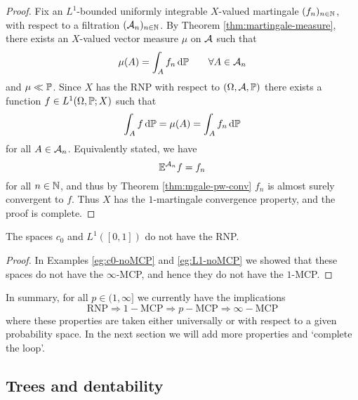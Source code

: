 \begin{proof}
  Fix an $L^1$-bounded uniformly integrable $X$-valued martingale $(f_n)_{n \in \N}$, with respect to a filtration $(\mc{A}_{n})_{n \in \N}$.
  By Theorem \ref{thm:martingale-measure}, there exists an $X$-valued vector measure $\mu$ on $\mc{A}$ such that
  \begin{equation*}
    \mu(A) = \int_{A} f_n \, \dd\P \qquad \forall A \in \mc{A}_n
  \end{equation*}
  and $\mu \ll \P$.
  Since $X$ has the RNP with respect to $(\Omega,\mc{A},\P)$ there exists a function $f \in L^1(\Omega,\P;X)$ such that
  \begin{equation*}
    \int_{A} f \, \dd\P = \mu(A) = \int_A f_n \, \dd\P
  \end{equation*}
  for all $A \in \mc{A}_n$.
  Equivalently stated, we have
  \begin{equation*}
    \E^{\mc{A}_n} f = f_n
  \end{equation*}
  for all $n \in \N$, and thus by Theorem \ref{thm:mgale-pw-conv} $f_n$ is almost surely convergent to $f$.
  Thus $X$ has the $1$-martingale convergence property, and the proof is complete.
\end{proof}

\begin{cor}
  The spaces $c_0$ and $L^1([0,1])$ do not have the RNP.
\end{cor}

\begin{proof}
  In Examples \ref{eg:c0-noMCP} and \ref{eg:L1-noMCP} we showed that these spaces do not have the $\infty$-MCP, and hence they do not have the $1$-MCP. 
\end{proof}

In summary, for all $p \in (1,\infty]$ we currently have the implications
\begin{equation*}
  \mathrm{RNP} \Longrightarrow 1-\mathrm{MCP} \Longrightarrow p-\mathrm{MCP} \Longrightarrow \infty-\mathrm{MCP}
\end{equation*}
where these properties are taken either universally or with respect to a given probability space.
In the next section we will add more properties and `complete the loop'.

\subsection{Trees and dentability}


